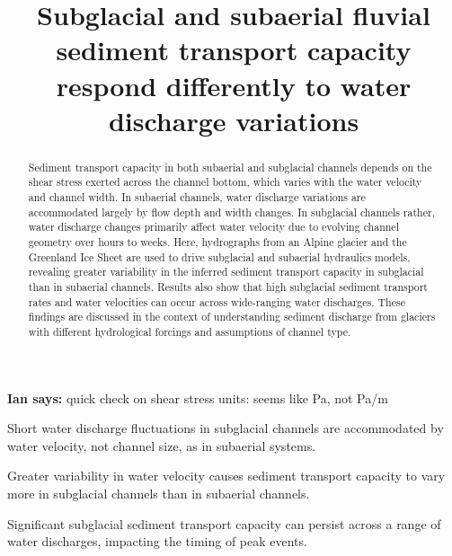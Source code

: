 \documentclass[draft]{agujournal2019}
\newcommand{\ian}[1]{{\textbf{\color{blue}Ian says:} \color{blue} #1} }
\begin{document}
\title{Subglacial and subaerial fluvial sediment transport capacity respond differently to water discharge variations}



\ian{quick check on shear stress units: seems like Pa, not Pa/m}
\begin{keypoints}
\item Short water discharge fluctuations in subglacial channels are accommodated by water velocity, not channel size, as in subaerial systems.
\item Greater variability in water velocity causes sediment transport capacity to vary more in subglacial channels than in subaerial channels.
\item Significant subglacial sediment transport capacity can persist across a range of water discharges, impacting the  timing of peak events.
\end{keypoints}

\begin{abstract}
  Sediment transport capacity in both subaerial and subglacial channels depends on the shear stress exerted across the channel bottom, which varies with the water velocity and channel width.
  In subaerial channels, water discharge variations are accommodated largely by flow depth and width changes.
  In subglacial channels rather, water discharge changes primarily affect water velocity due to evolving channel geometry over hours to weeks.
  Here, hydrographs from an Alpine glacier and the Greenland Ice Sheet are used to drive subglacial and subaerial hydraulics models, revealing greater variability in the inferred sediment transport capacity in subglacial than in subaerial channels.
  Results also show that high subglacial sediment transport rates and water velocities can occur across wide-ranging water discharges.
  These findings are discussed in the context of understanding sediment discharge from glaciers with different hydrological forcings and assumptions of channel type.
\end{abstract}
\end{document}
